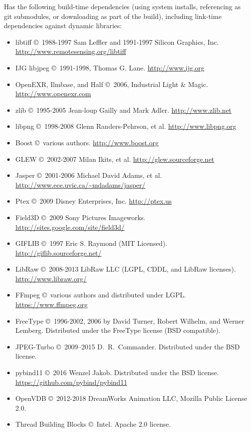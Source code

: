 \noindent \product Has the following build-time dependencies (using
system installs, referencing as git submodules, or downloading as part of
the build), including link-time dependencies
against dynamic libraries:

\begin{itemize}
\item {\cf libtiff} \copyright\ 1988-1997 Sam Leffler and 1991-1997 Silicon
Graphics, Inc. \\ \url{http://www.remotesensing.org/libtiff}
\item {\cf IJG libjpeg} \copyright\ 1991-1998, Thomas G. Lane.  \url{http://www.ijg.org}
\item OpenEXR, Ilmbase, and Half \copyright\ 2006, Industrial Light \& Magic.\\
\url{http://www.openexr.com}
\item {\cf zlib} \copyright\ 1995-2005 Jean-loup Gailly and Mark Adler. 
\url{http://www.zlib.net}
\item {\cf libpng} \copyright\ 1998-2008 Glenn Randers-Pehrson, et al.  
\url{http://www.libpng.org}
\item Boost \copyright\ various authors. \url{http://www.boost.org}
\item GLEW \copyright\ 2002-2007 Milan Ikits, et al. 
\url{http://glew.sourceforge.net}
\item Jasper \copyright\ 2001-2006 Michael David Adams, et al. \\
\url{http://www.ece.uvic.ca/~mdadams/jasper/}
\item Ptex \copyright\ 2009 Disney Enterprises, Inc.
\url{http://ptex.us}
\item Field3D \copyright\ 2009 Sony Pictures Imageworks.
\url{http://sites.google.com/site/field3d/}
\item {\cf GIFLIB} \copyright\ 1997 Eric S. Raymond (MIT Licensed).
\url{http://giflib.sourceforge.net/}
\item {\cf LibRaw} \copyright\ 2008-2013 LibRaw LLC (LGPL, CDDL, and LibRaw
    licenses). \\ \url{http://www.libraw.org/}
\item {\cf FFmpeg} \copyright\ various authors and distributed under LGPL.
   \url{https://www.ffmpeg.org}
\item {\cf FreeType} \copyright\ 1996-2002, 2006 by David Turner, Robert
    Wilhelm, and Werner Lemberg. Distributed under the FreeType license (BSD compatible).
\item {\cf JPEG-Turbo} \copyright\ 2009--2015 D.\ R.\ Commander. Distributed
    under the BSD license.
\item {\cf pybind11} \copyright\ 2016 Wenzel Jakob. Distributed under the
    BSD license. \url{https://github.com/pybind/pybind11}
\item {\cf OpenVDB} \copyright\ 2012-2018 DreamWorks Animation LLC,
Mozilla Public License 2.0.
\item {\cf Thread Building Blocks} \copyright\ Intel. Apache 2.0 license.
\end{itemize}



\chapwidthend
